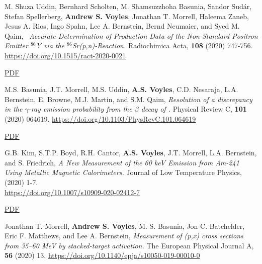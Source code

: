 \begin{bibsection}
\item M. Shuza Uddin, Bernhard Scholten, M. Shamsuzzhoha Basunia, Sandor Sudár, Stefan Spellerberg, \textbf{Andrew S. Voyles}, Jonathan T. Morrell, Haleema Zaneb, Jesus A. Rios, Ingo Spahn, Lee A. Bernstein, Bernd Neumaier, and Syed M. Qaim, \ \emph{Accurate Determination of Production Data of the Non-Standard Positron Emitter $^{86}$Y via the $^{86}$Sr(p,n)-Reaction.} Radiochimica Acta, \textbf{108} (2020) 747-756. \url{https://doi.org/10.1515/ract-2020-0021} 

\ifshort \vspace{0.1cm} \href{https://avoyles.github.io/papers/Uddin2020_86Y.pdf}{\underline{PDF}} \else  \fi 

\item M.S. Basunia, J.T. Morrell, M.S. Uddin, \textbf{A.S. Voyles}, C.D. Nesaraja, L.A. Bernstein, E. Browne, M.J. Martin, and S.M. Qaim, \emph{Resolution of a discrepancy in the $\gamma$-ray emission probability from the $\beta$ decay of .} Physical Review C, \textbf{101} (2020) 064619. \url{https://doi.org/10.1103/PhysRevC.101.064619} 

\ifshort \vspace{0.1cm} \href{https://avoyles.github.io/papers/Basunia2020_BR.pdf}{\underline{PDF}} \else  \fi 





\item G.B. Kim, S.T.P. Boyd, R.H. Cantor, \textbf{A.S. Voyles}, J.T. Morrell, L.A. Bernstein, and S. Friedrich, \emph{A New Measurement of the 60 keV Emission from Am-241 Using Metallic Magnetic Calorimeters.} Journal of Low Temperature Physics,  (2020) 1-7. \\\url{https://doi.org/10.1007/s10909-020-02412-7} 

\ifshort \vspace{0.1cm} \href{https://avoyles.github.io/papers/Kim2020_Calorimeter.pdf}{\underline{PDF}} \else  \fi 




\item Jonathan T. Morrell, \textbf{Andrew S. Voyles}, M. S. Basunia, Jon C. Batchelder, Eric F. Matthews, and Lee A. Bernstein, \emph{Measurement of (p,x) cross sections from 35--60 MeV by stacked-target activation.} The European Physical Journal A, \textbf{56} (2020) 13. \url{https://doi.org/10.1140/epja/s10050-019-00010-0} 


\end{bibsection}
